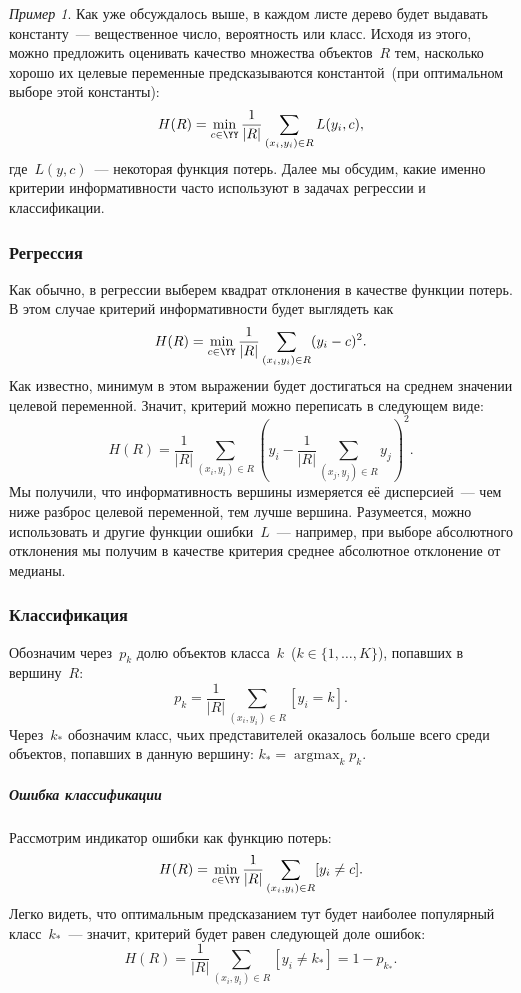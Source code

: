 \documentclass[a4paper, 12pt]{article}
\DeclareMathOperator{\argmax}{argmax }
\theoremstyle{plain} %
\theoremstyle{definition} %
\theoremstyle{remark} %
\newtheorem{example}{Пример}
\begin{document}
\begin{example}
Как уже обсуждалось выше, в каждом листе дерево будет выдавать константу~--- вещественное число, вероятность
или класс.
Исходя из этого, можно предложить оценивать качество множества объектов~$R$ тем,
насколько хорошо их целевые переменные предсказываются константой~(при оптимальном выборе этой константы):
\[
    H(R)
    =
    \min_{c \in \YY}
    \frac{1}{|R|}
    \sum_{(x_i, y_i) \in R}
        L(y_i, c),
\]
где~$L(y, c)$~--- некоторая функция потерь.
Далее мы обсудим, какие именно критерии информативности часто используют в задачах регрессии и классификации.

\subsubsection{Регрессия}
Как обычно, в регрессии выберем квадрат отклонения в качестве функции потерь.
В этом случае критерий информативности будет выглядеть как
\[
    H(R)
    =
    \min_{c \in \YY}
    \frac{1}{|R|}
    \sum_{(x_i, y_i) \in R}
        (y_i - c)^2.
\]
Как известно, минимум в этом выражении будет достигаться на среднем значении целевой переменной.
Значит, критерий можно переписать в следующем виде:
\[
    H(R)
    =
    \frac{1}{|R|}
    \sum_{(x_i, y_i) \in R}
    \left(
        y_i
        -
        \frac{1}{|R|}
        \sum_{(x_j, y_j) \in R}
            y_j
    \right)^2.
\]
Мы получили, что информативность вершины измеряется её дисперсией~---
чем ниже разброс целевой переменной, тем лучше вершина.
Разумеется, можно использовать и другие функции ошибки~$L$~---
например, при выборе абсолютного отклонения мы получим в качестве критерия среднее абсолютное отклонение от медианы.

\subsubsection{Классификация}
Обозначим через~$p_{k}$ долю объектов класса~$k$~($k \in \{1, \dots, K\}$), попавших в вершину~$R$:
\[
    p_{k}
    =
    \frac{1}{|R|}
    \sum_{(x_i, y_i) \in R}
        [y_i = k].
\]
Через~$k_*$ обозначим класс, чьих представителей оказалось больше всего среди объектов,
попавших в данную вершину: $k_* = \argmax_k p_{k}$.

\subparagraph{Ошибка классификации}
Рассмотрим индикатор ошибки как функцию потерь:
\[
    H(R)
    =
    \min_{c \in \YY}
    \frac{1}{|R|}
    \sum_{(x_i, y_i) \in R}
        [y_i \neq c].
\]
Легко видеть, что оптимальным предсказанием тут будет наиболее популярный класс~$k_*$~---
значит, критерий будет равен следующей доле ошибок:
\[
    H(R)
    =
    \frac{1}{|R|}
    \sum_{(x_i, y_i) \in R}
        [y_i \neq k_*]
    =
    1 - p_{k_*}.
\]


\end{example}
\end{document}
